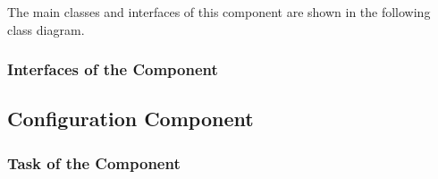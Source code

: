 \documentclass[11pt,a4paper]{article}
\begin{document}
The main classes and interfaces of this component are shown in the following
class diagram.

\begin{center}
\end{center}

\subsubsection{Interfaces of the Component}

\subsection{Configuration Component}
\label{sec:conf-comp}

\subsubsection{Task of the Component}
\end{document}
